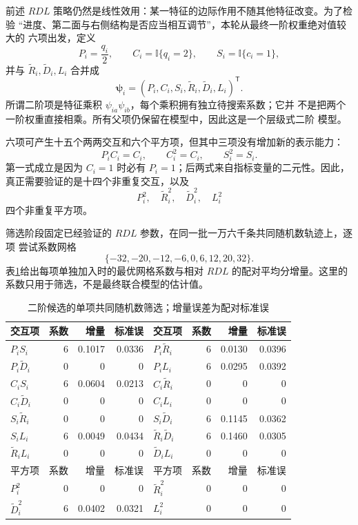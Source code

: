\documentclass[UTF8,11pt,openany]{ctexrep}
\newcommand{\ind}{\mathbb{I}}
\begin{document}
前述 $RDL$ 策略仍然是线性效用：某一特征的边际作用不随其他特征改变。为了检验
“进度、第二面与右侧结构是否应当相互调节”，本轮从最终一阶权重绝对值较大的
六项出发，定义
\[
P_i=\frac{q_i}{2},\qquad
C_i=\ind\{q_i=2\},\qquad
S_i=\ind\{c_i=1\},
\]
并与 $\widetilde R_i,\widetilde D_i,L_i$ 合并成
\[
\boldsymbol\psi_i=(P_i,C_i,S_i,\widetilde R_i,\widetilde D_i,L_i)^{\mathsf T}.
\]
所谓二阶项是特征乘积 $\psi_{ia}\psi_{ib}$，每个乘积拥有独立待搜索系数；它并
不是把两个一阶权重直接相乘。所有父项仍保留在模型中，因此这是一个层级式二阶
模型。

六项可产生十五个两两交互和六个平方项，但其中三项没有增加新的表示能力：
\[
P_iC_i=C_i,\qquad C_i^2=C_i,\qquad S_i^2=S_i.
\]
第一式成立是因为 $C_i=1$ 时必有 $P_i=1$；后两式来自指标变量的二元性。因此，
真正需要验证的是十四个非重复交互，以及
\[
P_i^2,\quad \widetilde R_i^2,\quad \widetilde D_i^2,\quad L_i^2
\]
四个非重复平方项。

筛选阶段固定已经验证的 $RDL$ 参数，在同一批一万六千条共同随机数轨迹上，逐项
尝试系数网格
\[
\{-32,-20,-12,-6,0,6,12,20,32\}.
\]
表\ref{tab:interaction-screen}给出每项单独加入时的最优网格系数与相对 $RDL$
的配对平均分增量。这里的系数只用于筛选，不是最终联合模型的估计值。

\begin{table}[htbp]
\centering
\scriptsize
\caption{二阶候选的单项共同随机数筛选；增量误差为配对标准误}
\label{tab:interaction-screen}
\begin{tabular}{lrrr@{\qquad}lrrr}
\toprule
交互项 & 系数 & 增量 & 标准误 & 交互项 & 系数 & 增量 & 标准误 \\
\midrule
$P_iS_i$ & 6 & 0.1017 & 0.0336 & $P_i\widetilde R_i$ & 6 & 0.0130 & 0.0396 \\
$P_i\widetilde D_i$ & 0 & 0 & 0 & $P_iL_i$ & 6 & 0.0295 & 0.0392 \\
$C_iS_i$ & 6 & 0.0604 & 0.0213 & $C_i\widetilde R_i$ & 0 & 0 & 0 \\
$C_i\widetilde D_i$ & 0 & 0 & 0 & $C_iL_i$ & 0 & 0 & 0 \\
$S_i\widetilde R_i$ & 0 & 0 & 0 & $S_i\widetilde D_i$ & 6 & 0.1145 & 0.0362 \\
$S_iL_i$ & 6 & 0.0049 & 0.0434 & $\widetilde R_i\widetilde D_i$ & 6 & 0.1460 & 0.0305 \\
$\widetilde R_iL_i$ & 0 & 0 & 0 & $\widetilde D_iL_i$ & 0 & 0 & 0 \\
\midrule
平方项 & 系数 & 增量 & 标准误 & 平方项 & 系数 & 增量 & 标准误 \\
\midrule
$P_i^2$ & 0 & 0 & 0 & $\widetilde R_i^2$ & 0 & 0 & 0 \\
$\widetilde D_i^2$ & 6 & 0.0402 & 0.0321 & $L_i^2$ & 0 & 0 & 0 \\
\bottomrule
\end{tabular}
\end{table}
\end{document}
